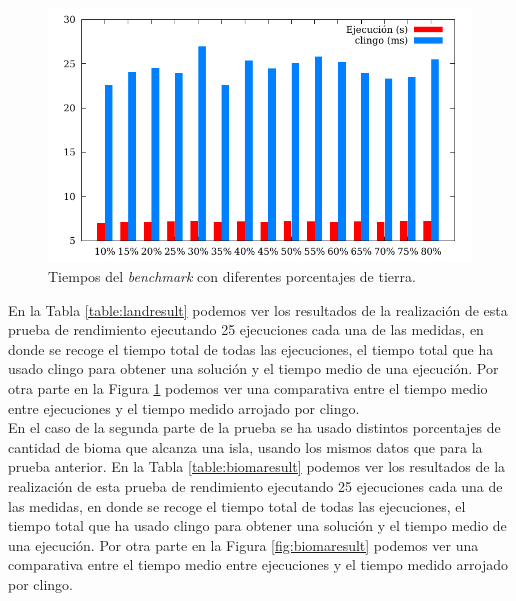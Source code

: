 \begin{figure}[!h]
	\centering
	\includegraphics[width=.9\textwidth]{tables/land-size.pdf}
	\caption{Tiempos del \textit{benchmark} con diferentes porcentajes de tierra.}\label{fig:landresult}
\end{figure}

En la Tabla \ref{table:landresult} podemos ver los resultados de la realización de esta prueba de rendimiento ejecutando 25 ejecuciones cada una de las medidas, en donde se recoge el tiempo total de todas las ejecuciones, el tiempo total que ha usado clingo para obtener una solución y el tiempo medio de una ejecución. Por otra parte en la Figura \ref{fig:landresult} podemos ver una comparativa entre el tiempo medio entre ejecuciones y el tiempo medido arrojado por clingo. \\

En el caso de la segunda parte de la prueba se ha usado distintos porcentajes de cantidad de bioma que alcanza una isla, usando los mismos datos que para la prueba anterior. En la Tabla \ref{table:biomaresult} podemos ver los resultados de la realización de esta prueba de rendimiento ejecutando 25 ejecuciones cada una de las medidas, en donde se recoge el tiempo total de todas las ejecuciones, el tiempo total que ha usado clingo para obtener una solución y el tiempo medio de una ejecución. Por otra parte en la Figura \ref{fig:biomaresult} podemos ver una comparativa entre el tiempo medio entre ejecuciones y el tiempo medido arrojado por clingo.

